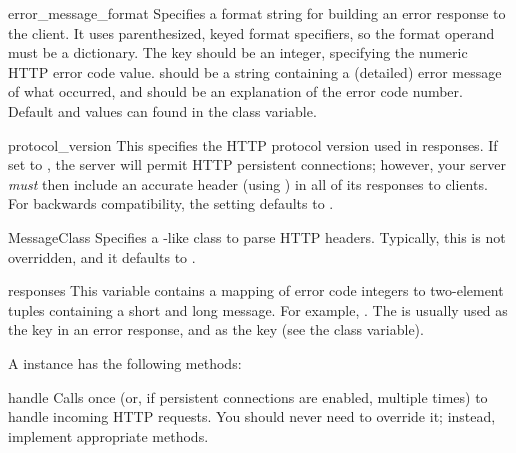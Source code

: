 \begin{memberdesc}{error_message_format}
Specifies a format string for building an error response to the
client. It uses parenthesized, keyed format specifiers, so the
format operand must be a dictionary. The  key should
be an integer, specifying the numeric HTTP error code value.
 should be a string containing a (detailed) error
message of what occurred, and  should be an
explanation of the error code number. Default 
and  values can found in the 
class variable.
\end{memberdesc}

\begin{memberdesc}{protocol_version}
This specifies the HTTP protocol version used in responses.  If set
to , the server will permit HTTP persistent
connections; however, your server \emph{must} then include an
accurate  header (using )
in all of its responses to clients.  For backwards compatibility,
the setting defaults to .
\end{memberdesc}

\begin{memberdesc}{MessageClass}
Specifies a -like class to parse HTTP
headers. Typically, this is not overridden, and it defaults to
.
\end{memberdesc}

\begin{memberdesc}{responses}
This variable contains a mapping of error code integers to two-element
tuples containing a short and long message. For example,
. The
 is usually used as the  key in an
error response, and  as the  key
(see the  class variable).
\end{memberdesc}


A  instance has the following methods:

\begin{methoddesc}{handle}{}
Calls  once (or, if persistent connections
are enabled, multiple times) to handle incoming HTTP requests.
You should never need to override it; instead, implement appropriate
 methods.
\end{methoddesc}

